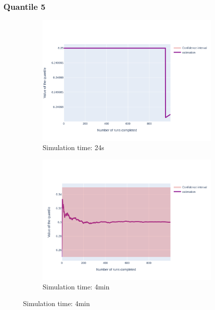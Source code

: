 \documentclass{article}
\begin{document}
\subsubsection{Quantile 5}
\begin{figure}[H]
    \centering
    \begin{subfigure}{.495\textwidth}
        \centering
        \includegraphics[width=\textwidth]{../fig/quantile5/TFTP4_DAT_24s.png}
        \caption{Simulation time: 24s}
        \vspace{.5cm}
    \end{subfigure}
    \begin{subfigure}{.495\textwidth}
        \centering
        \includegraphics[width=\textwidth]{../fig/quantile5/TFTP4 DAT_4mn.png}
        \caption{Simulation time: 4min}
        \vspace{.5cm}

\end{subfigure}
\end{figure}
\end{document}
